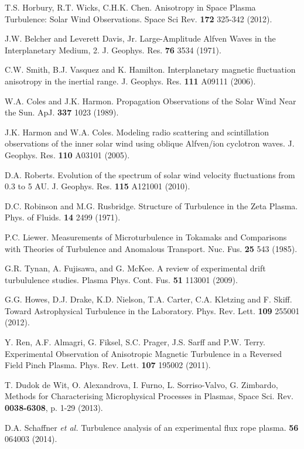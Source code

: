 \documentclass[aip,prl,amsmath,amssymb,reprint,superscriptaddress]{revtex4-1} %
\begin{document}
\begin{thebibliography}{99}
 T.S. Horbury, R.T. Wicks, C.H.K. Chen. Anisotropy in Space Plasma Turbulence: Solar Wind Observations. Space Sci Rev. {\bf 172} 325-342 (2012).

 J.W. Belcher and Leverett Davis, Jr. Large-Amplitude Alfven Waves in the Interplanetary Medium, 2. J. Geophys. Res. {\bf 76} 3534 (1971).

 C.W. Smith, B.J. Vasquez and K. Hamilton. Interplanetary magnetic fluctuation anisotropy in the inertial range. J. Geophys. Res. {\bf 111} A09111 (2006).

 W.A. Coles and J.K. Harmon. Propagation Observations of the Solar Wind Near the Sun. ApJ. {\bf 337} 1023 (1989).

 J.K. Harmon and W.A. Coles. Modeling radio scattering and scintillation observations of the inner solar wind using oblique Alfven/ion cyclotron waves. J. Geophys. Res. {\bf 110} A03101 (2005).

 D.A. Roberts. Evolution of the spectrum of solar wind velocity fluctuations from 0.3 to 5 AU. J. Geophys. Res. {\bf 115} A121001 (2010).

 D.C. Robinson and M.G. Rusbridge. Structure of Turbulence in the Zeta Plasma. Phys. of Fluids. {\bf 14} 2499 (1971).

 P.C. Liewer. Measurements of Microturbulence in Tokamaks and Comparisons with Theories of Turbulence and Anomalous Transport. Nuc. Fus. {\bf 25} 543 (1985).

 G.R. Tynan, A. Fujisawa, and G. McKee. A review of experimental drift turbululence studies. Plasma Phys. Cont. Fus. {\bf 51} 113001 (2009).

 G.G. Howes, D.J. Drake, K.D. Nielson, T.A. Carter, C.A. Kletzing and F. Skiff. Toward Astrophysical Turbulence in the Laboratory. Phys. Rev. Lett. {\bf 109} 255001 (2012).

 Y. Ren, A.F. Almagri, G. Fiksel, S.C. Prager, J.S. Sarff and P.W. Terry. Experimental Observation of Anisotropic Magnetic Turbulence in a Reversed Field Pinch Plasma. Phys. Rev. Lett. {\bf 107} 195002 (2011).

 T. Dudok de Wit, O. Alexandrova, I. Furno, L. Sorriso-Valvo, G. Zimbardo, Methods for Characterising Microphysical Processes in Plasmas, Space Sci. Rev. {\bf 0038-6308}, p. 1-29 (2013).

 D.A. Schaffner {\it et al.} Turbulence analysis of an experimental flux rope plasma. {\bf 56} 064003 (2014).


\end{thebibliography}
\end{document}
